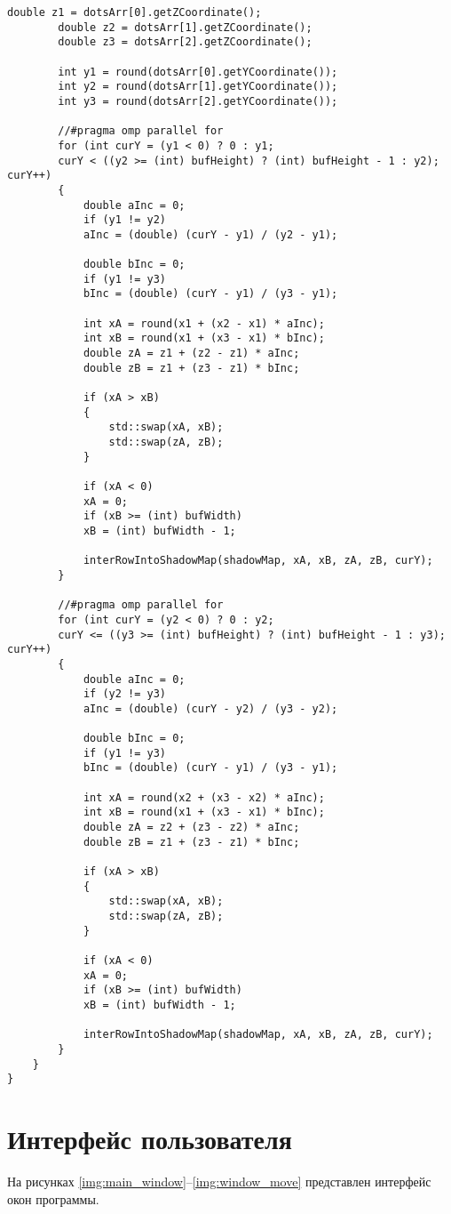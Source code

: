 \begin{center}
\begin{lstlisting}[caption=Реализация алгоритма Z-буфера для теней]
		double z1 = dotsArr[0].getZCoordinate();
		double z2 = dotsArr[1].getZCoordinate();
		double z3 = dotsArr[2].getZCoordinate();
		
		int y1 = round(dotsArr[0].getYCoordinate());
		int y2 = round(dotsArr[1].getYCoordinate());
		int y3 = round(dotsArr[2].getYCoordinate());
		
		//#pragma omp parallel for
		for (int curY = (y1 < 0) ? 0 : y1;
		curY < ((y2 >= (int) bufHeight) ? (int) bufHeight - 1 : y2); curY++)
		{
			double aInc = 0;
			if (y1 != y2)
			aInc = (double) (curY - y1) / (y2 - y1);
			
			double bInc = 0;
			if (y1 != y3)
			bInc = (double) (curY - y1) / (y3 - y1);
			
			int xA = round(x1 + (x2 - x1) * aInc);
			int xB = round(x1 + (x3 - x1) * bInc);
			double zA = z1 + (z2 - z1) * aInc;
			double zB = z1 + (z3 - z1) * bInc;
			
			if (xA > xB)
			{
				std::swap(xA, xB);
				std::swap(zA, zB);
			}
			
			if (xA < 0)
			xA = 0;
			if (xB >= (int) bufWidth)
			xB = (int) bufWidth - 1;
			
			interRowIntoShadowMap(shadowMap, xA, xB, zA, zB, curY);
		}
		
		//#pragma omp parallel for
		for (int curY = (y2 < 0) ? 0 : y2;
		curY <= ((y3 >= (int) bufHeight) ? (int) bufHeight - 1 : y3); curY++)
		{
			double aInc = 0;
			if (y2 != y3)
			aInc = (double) (curY - y2) / (y3 - y2);
			
			double bInc = 0;
			if (y1 != y3)
			bInc = (double) (curY - y1) / (y3 - y1);
			
			int xA = round(x2 + (x3 - x2) * aInc);
			int xB = round(x1 + (x3 - x1) * bInc);
			double zA = z2 + (z3 - z2) * aInc;
			double zB = z1 + (z3 - z1) * bInc;
			
			if (xA > xB)
			{
				std::swap(xA, xB);
				std::swap(zA, zB);
			}
			
			if (xA < 0)
			xA = 0;
			if (xB >= (int) bufWidth)
			xB = (int) bufWidth - 1;
			
			interRowIntoShadowMap(shadowMap, xA, xB, zA, zB, curY);
		}
	}
}
	\end{lstlisting}
\end{center}

\section{Интерфейс пользователя}

На рисунках \ref{img:main_window}--\ref{img:window_move} представлен интерфейс окон программы.

